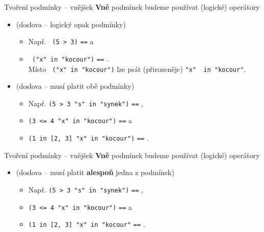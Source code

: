 \begin{frame}{Tvoření podmínky -- vnějšek}
 \textbf{Vně} podmínek budeme používat (logické) operátory
 \begin{itemize}
  \item<1-> \texttt{} (doslova  -- logický opak podmínky)
   \begin{itemize}
    \item Např. \texttt{ (5 > 3)} \texttt{==} \texttt{} a
    \item \texttt{ ("x"~in "kocour")} \texttt{==} \texttt{}.\\
     Místo \texttt{ ("x"~in "kocour")} lze psát (přirozenějc)
     \texttt{"x"~ in "kocour"}.
   \end{itemize}
  \item<2->  (doslova  -- musí platit obě podmínky)
   \begin{itemize}
    \item Např. \texttt{(5 > 3  "s"~in "synek")} \texttt{==}
     \texttt{},
    \item \texttt{(3 <= 4  "x"~in "kocour")} \texttt{==}
     \texttt{} a
    \item \texttt{(1 in [2, 3]  "x"~in "kocour")} \texttt{==}
     \texttt{}.
   \end{itemize}
 \end{itemize}
\end{frame}

\begin{frame}{Tvoření podmínky -- vnějšek}
 \textbf{Vně} podmínek budeme používat (logické) operátory
 \begin{itemize}
  \item {} (doslova  -- musí platit \textbf{alespoň} jedna z
   podmínek)
   \begin{itemize}
    \item Např. \texttt{(5 > 3  "s"~in "synek")} \texttt{==}
     \texttt{},
    \item \texttt{(3 <= 4  "x"~in "kocour")} \texttt{==}
     \texttt{} a
    \item \texttt{(1 in [2, 3]  "x"~in "kocour"} \texttt{==}
     \texttt{}.
   \end{itemize}
 \end{itemize}
\end{frame}

